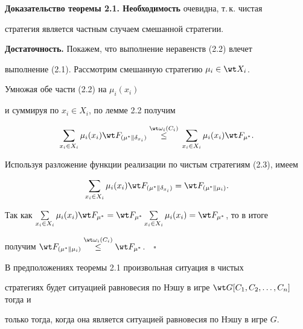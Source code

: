 \addtocounter{lems}{1}


 


{\bf Доказательство теоремы 2.1. Необходимость} очевидна, т.\,к. чистая 


стратегия является частным случаем смешанной стратегии. 


\smallskip 


 


{\bf Достаточность.} Покажем, что выполнение неравенств (2.2) влечет 


выполнение (2.1). Рассмотрим смешанную стратегию $\mu_i\in\wt X_i$. 


Умножая обе части (2.2) на $\mu_i(x_i)$ 


и суммируя по $x_i\in X_i$, по лемме 2.2 получим 


$$ 


\sum_{x_i\in X_i}\mu_i(x_i)\wt F_{(\mu^*\|\delta_{x_i})} 


\up{\wt\omega_i(C_i)}{\le}\sum_{x_i\in X_i}\mu_i(x_i) 


\wt F_{\mu^*}. 


$$ 


Используя разложение функции реализации по чистым стратегиям (2.3), имеем 


$$ 


\sum_{x_i\in X_i}\mu_i(x_i)\wt F_{(\mu^*\|\delta_{x_i})} 


=\wt F_{(\mu^*\|\mu_i)}. 


$$ 


Так как $\sum\limits_{x_i\in X_i}\mu_i(x_i)\wt F_{\mu^*}=\wt 


F_{\mu^*}\sum\limits_{x_i\in X_i}\mu_i(x_i)=\wt F_{\mu^*}$, то в итоге 


получим $\wt F_{(\mu^*\|\mu_i)}\up{\wt\omega_i(C_i)}{\le}\wt 


F_{\mu^*}$.$\quad\square$ 


 


\begin{cornonum} 


В предположениях теоремы 2.1 произвольная ситуация в чистых 


стратегиях будет ситуацией равновесия по Нэшу в игре $\wt 


G[C_1,C_2,\dotsc,C_n]$ тогда и 


только тогда, когда она является ситуацией равновесия по Нэшу в игре $G$. 


\end{cornonum} 


